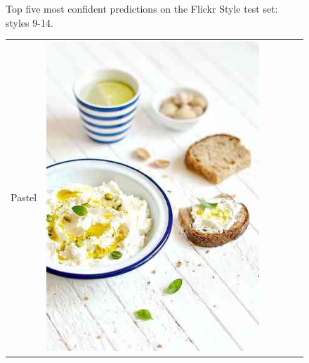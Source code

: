 \begin{figure}
\begin{tabular}{m{.01\linewidth} m{.16\linewidth} m{.16\linewidth} m{.16\linewidth} m{.16\linewidth} m{.16\linewidth}}
\end{tabular}
\caption{
    Top five most confident predictions on the Flickr Style test set: styles 9-14.
}\label{fig:flickr_on_flickr2}
\end{figure}

\begin{figure}
\centering
    \begin{tabular}{m{.01\linewidth} m{.16\linewidth} m{.16\linewidth} m{.16\linewidth} m{.16\linewidth} m{.16\linewidth}}
    \begin{turn}{90}{Pastel}\end{turn} &
    \includegraphics[width=\linewidth]{../style/figures/flickr_on_flickr/pred_style_Pastel/0.jpg} &

\end{tabular}
\end{figure}
